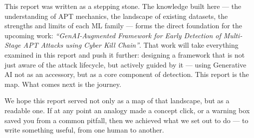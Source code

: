 ﻿\documentclass[11pt,a4paper]{report}
\begin{document}
This report was written as a stepping stone. The knowledge built here --- the
understanding of APT mechanics, the landscape of existing datasets, the
strengths and limits of each ML family --- forms the direct foundation for
the upcoming work: \textit{``GenAI-Augmented Framework for Early Detection of
Multi-Stage APT Attacks using Cyber Kill Chain''}. That work will take
everything examined in this report and push it further: designing a framework
that is not just aware of the attack lifecycle, but actively guided by it ---
using Generative AI not as an accessory, but as a core component of
detection. This report is the map. What comes next is the journey.

We hope this report served not only as a map of that landscape, but as a
readable one. If at any point an analogy made a concept click, or a warning
box saved you from a common pitfall, then we achieved what we set out to do
--- to write something useful, from one human to another.



\end{document}
